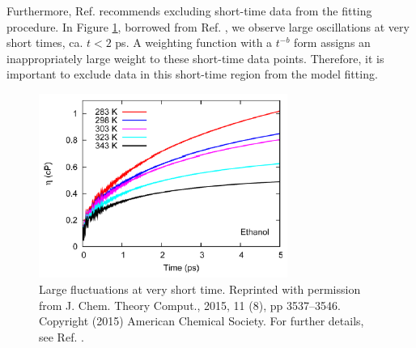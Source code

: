 \documentclass[9pt,bestpractices]{livecoms}
\begin{document}
Furthermore, Ref. \cite{Zhang2015} recommends excluding short-time data from the fitting procedure. In Figure \ref{fig:ZhangFig4}, borrowed from Ref. \cite{Zhang2015}, we observe large oscillations at very short times, ca. $t < 2$ ps. A weighting function with a $t^{-b}$ form assigns an inappropriately large weight to these short-time data points. Therefore, it is important to exclude data in this short-time region from the model fitting. 

\begin{figure}[htb!]
	\centering
	\includegraphics[width=3.2in]{ZhangFig4.png}
	\caption{Large fluctuations at very short time. Reprinted with permission from J. Chem. Theory Comput., 2015, 11 (8), pp 3537–3546. Copyright (2015) American Chemical Society. For further details, see Ref. \cite{Zhang2015}.}
	\label{fig:ZhangFig4}
\end{figure}  


\end{document}
